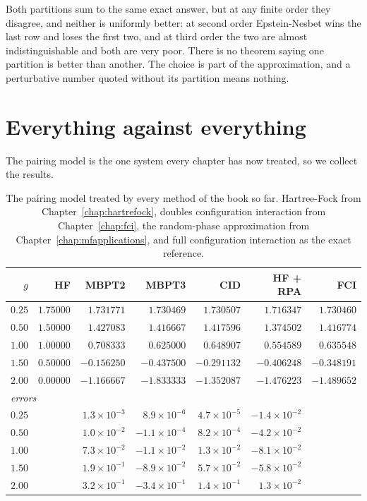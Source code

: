 Both partitions sum to the same exact answer, but at any finite order they
disagree, and neither is uniformly better: at second order Epstein-Nesbet
wins the last row and loses the first two, and at third order the two are
almost indistinguishable and both are very poor.  There is no theorem saying
one partition is better than another.  The choice is part of the
approximation, and a perturbative number quoted without its partition means
nothing.

\section{Everything against everything}
\label{sec:mbptcomparison}

The pairing model is the one system every chapter has now treated, so we
collect the results.

\begin{table}[h]
\centering
\renewcommand{\arraystretch}{1.25}
\setlength{\tabcolsep}{8pt}
\begin{tabular}{rrrrrrr}
\toprule
$g$ & HF & MBPT2 & MBPT3 & CID & HF + RPA & FCI\\
\midrule
$0.25$ & $1.75000$ & $1.731771$ & $1.730469$ & $1.730507$ & $1.716347$
  & $1.730460$\\
$0.50$ & $1.50000$ & $1.427083$ & $1.416667$ & $1.417596$ & $1.374502$
  & $1.416774$\\
$1.00$ & $1.00000$ & $0.708333$ & $0.625000$ & $0.648907$ & $0.554589$
  & $0.635548$\\
$1.50$ & $0.50000$ & $-0.156250$ & $-0.437500$ & $-0.291132$ & $-0.406248$
  & $-0.348191$\\
$2.00$ & $0.00000$ & $-1.166667$ & $-1.833333$ & $-1.352087$ & $-1.476223$
  & $-1.489652$\\
\midrule
\multicolumn{7}{l}{\emph{errors}}\\
$0.25$ & & $1.3\times10^{-3}$ & $8.9\times10^{-6}$ & $4.7\times10^{-5}$
  & $-1.4\times10^{-2}$ & \\
$0.50$ & & $1.0\times10^{-2}$ & $-1.1\times10^{-4}$ & $8.2\times10^{-4}$
  & $-4.2\times10^{-2}$ & \\
$1.00$ & & $7.3\times10^{-2}$ & $-1.1\times10^{-2}$ & $1.3\times10^{-2}$
  & $-8.1\times10^{-2}$ & \\
$1.50$ & & $1.9\times10^{-1}$ & $-8.9\times10^{-2}$ & $5.7\times10^{-2}$
  & $-5.8\times10^{-2}$ & \\
$2.00$ & & $3.2\times10^{-1}$ & $-3.4\times10^{-1}$ & $1.4\times10^{-1}$
  & $1.3\times10^{-2}$ & \\
\bottomrule
\end{tabular}
\caption{The pairing model treated by every method of the book so far.
Hartree-Fock from Chapter~\ref{chap:hartrefock}, doubles configuration
interaction from Chapter~\ref{chap:fci}, the random-phase approximation from
Chapter~\ref{chap:mfapplications}, and full configuration interaction as the
exact reference.}
\label{tab:mbptcomparison}
\end{table}

